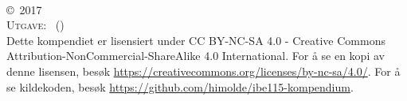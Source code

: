 
\begingroup
\thispagestyle{empty}
\vfill
\endgroup


\newpage
~\vfill
\thispagestyle{empty}

\noindent \copyright\ 2017 \myauthorname\\

\noindent \textsc{Utgave: \gitRel\ (\mydate)}\\


\noindent Dette kompendiet er lisensiert under CC BY-NC-SA 4.0 - Creative Commons Attribution-NonCommercial-ShareAlike 4.0 International. For å se en kopi av denne lisensen, besøk \url{https://creativecommons.org/licenses/by-nc-sa/4.0/}. For å se kildekoden, besøk \url{https://github.com/himolde/ibe115-kompendium}.\\ %


